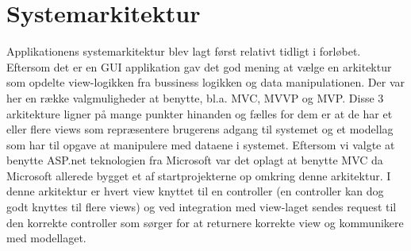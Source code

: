 \section{Systemarkitektur}

Applikationens systemarkitektur blev lagt først relativt tidligt i forløbet. Eftersom det er en GUI applikation gav det god mening at vælge en arkitektur som opdelte view-logikken fra bussiness logikken og data manipulationen. Der var her en række valgmuligheder at benytte, bl.a. MVC, MVVP og MVP. Disse 3 arkitekture ligner på mange punkter hinanden og fælles for dem er at de har et eller flere views som repræsentere brugerens adgang til systemet og et modellag som har til opgave at manipulere med dataene i systemet. Eftersom vi valgte at benytte ASP.net teknologien fra Microsoft var det oplagt at benytte MVC da Microsoft allerede bygget et af startprojekterne op omkring denne arkitektur. I denne arkitektur er hvert view knyttet til en controller (en controller kan dog godt knyttes til flere views) og ved integration med view-laget sendes request til den korrekte controller som sørger for at returnere korrekte view og kommunikere med modellaget. 
